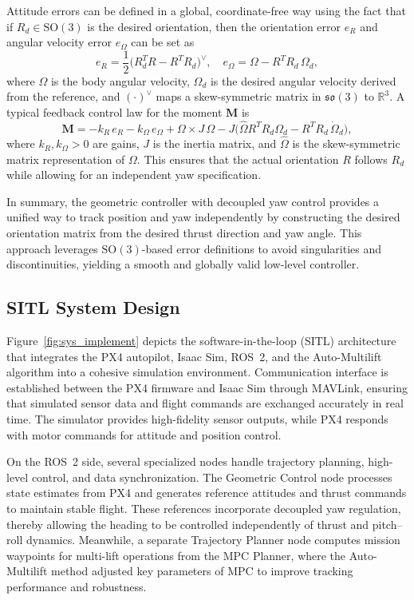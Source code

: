 \documentclass[12pt,twoside,letterpaper]{article}
\begin{document}
Attitude errors can be defined in a global, coordinate-free way using the fact that if \(R_d \in \mathrm{SO}(3)\) is the desired orientation, then the orientation error \(e_R\) and angular velocity error \(e_\Omega\) can be set as
\begin{equation}
e_R = \frac{1}{2} \bigl(R_d^T R - R^T R_d \bigr)^\vee, 
\quad
e_\Omega = \Omega - R^T R_d\,\Omega_d,
\end{equation}
where \(\Omega\) is the body angular velocity, \(\Omega_d\) is the desired angular velocity derived from the reference, and \((\cdot)^\vee\) maps a skew-symmetric matrix in \(\mathfrak{so}(3)\) to \(\mathbb{R}^3\). A typical feedback control law for the moment \(\mathbf{M}\) is
\begin{equation}
\mathbf{M} 
= -k_R\,e_R 
- k_\Omega\,e_\Omega 
+ \Omega \times J\,\Omega 
- J \bigl(\hat{\Omega} R^T R_d \Omega_d - R^T R_d\,\dot{\Omega}_d \bigr),
\end{equation}
where \(k_R, k_\Omega > 0\) are gains, \(J\) is the inertia matrix, and \(\hat{\Omega}\) is the skew-symmetric matrix representation of \(\Omega\). This ensures that the actual orientation \(R\) follows \(R_d\) while allowing for an independent yaw specification.

In summary, the geometric controller with decoupled yaw control provides a unified way to track position and yaw independently by constructing the desired orientation matrix from the desired thrust direction and yaw angle. This approach leverages \(\mathrm{SO}(3)\)-based error definitions to avoid singularities and discontinuities, yielding a smooth and globally valid low-level controller.

\subsection{SITL System Design}
\label{sec:sitl_system_design}

Figure~\ref{fig:sys_implement} depicts the software-in-the-loop (SITL) architecture that integrates the PX4 autopilot, Isaac Sim, ROS~2, and the Auto-Multilift algorithm into a cohesive simulation environment. Communication interface is established between the PX4 firmware and Isaac Sim through MAVLink, ensuring that simulated sensor data and flight commands are exchanged accurately in real time. The simulator provides high-fidelity sensor outputs, while PX4 responds with motor commands for attitude and position control.

On the ROS~2 side, several specialized nodes handle trajectory planning, high-level control, and data synchronization. The Geometric Control node processes state estimates from PX4 and generates reference attitudes and thrust commands to maintain stable flight. These references incorporate decoupled yaw regulation, thereby allowing the heading to be controlled independently of thrust and pitch–roll dynamics. Meanwhile, a separate Trajectory Planner node computes mission waypoints for multi-lift operations from the MPC Planner, where the Auto-Multilift method adjusted key parameters of MPC to improve tracking performance and robustness.
\end{document}
